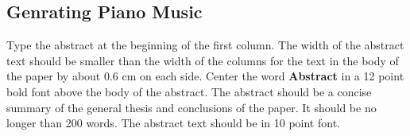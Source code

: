 \documentclass[11pt,a4paper]{article}
\begin{document}
%



\subsection{Genrating Piano Music }

Type the abstract at the beginning of the first
column. The width of the abstract text should be smaller than the
width of the columns for the text in the body of the paper by about
0.6 cm on each side. Center the word \textbf{Abstract} in a 12 point bold
font above the body of the abstract. The abstract should be a concise
summary of the general thesis and conclusions of the paper. It should
be no longer than 200 words. The abstract text should be in 10 point font.
\end{document}
